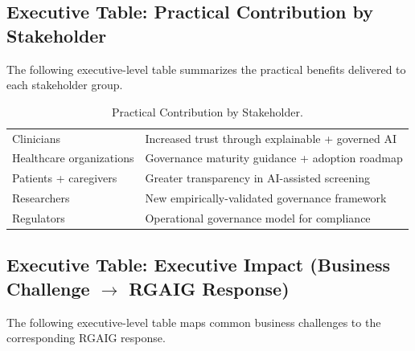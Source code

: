 \subsection{Executive Table: Practical Contribution by Stakeholder}
\label{sec:exec_practical_contribution}

\noindent The following executive-level table summarizes the practical benefits delivered to each stakeholder group.

{\tablestripes\tablefontsize
{}
\begin{xltabular}{\textwidth}{@{} >{\raggedright\arraybackslash}p{6cm} L @{}}
\caption[Practical Contribution by Stakeholder]{Practical Contribution by Stakeholder.}\label{tab:exec_practical_contribution} \\
\toprule
{} &  \\
\midrule
\endfirsthead
\endhead
\bottomrule
\endlastfoot
Clinicians & Increased trust through explainable + governed AI \\
\addlinespace
Healthcare organizations & Governance maturity guidance + adoption roadmap \\
\addlinespace
Patients + caregivers & Greater transparency in AI-assisted screening \\
\addlinespace
Researchers & New empirically-validated governance framework \\
\addlinespace
Regulators & Operational governance model for compliance \\
\end{xltabular}}


\subsection{Executive Table: Executive Impact (Business Challenge $\rightarrow$ RGAIG Response)}
\label{sec:exec_executive_impact}

\noindent The following executive-level table maps common business challenges to the corresponding RGAIG response.

